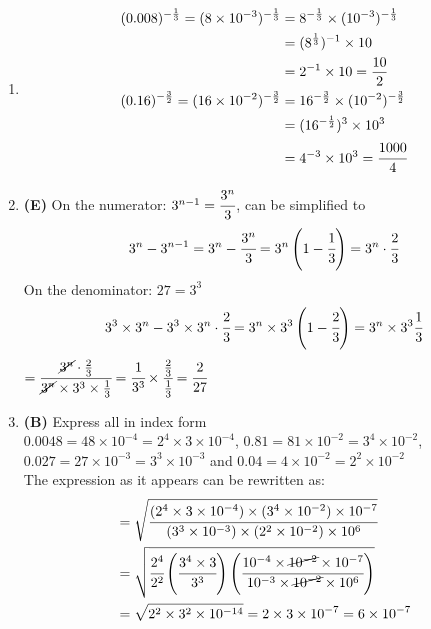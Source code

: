 \begin{multicols}{2}
\begin{enumerate}[label={\arabic*.}]
    \item 
    \begin{align*} 
        (0.008)^{-\frac{1}{3}} = (8 \times 10^{-3})^{-\frac{1}{3}} &= 8^{-\frac{1}{3}} \times (10^{-3})^{-\frac{1}{3}} \\
        & = (8^{\frac{1}{3}})^{-1} \times 10 \\
        & = 2^{-1} \times 10  = \dfrac{10}{2}\\
        (0.16)^{-\frac{3}{2}} = (16 \times 10^{-2})^{-\frac{3}{2}} &= 16^{-\frac{3}{2}} \times (10^{-2})^{-\frac{3}{2}} \\
        &= (16^{-\frac{1}{2}})^3 \times 10^3 \\
        & = 4^{-3} \times 10^3 =\cfrac{1000}{4}
    \end{align*}

    \item \textbf{(E)} On the numerator: $3^{n-1} = \cfrac{3^n}{3}$,  can be simplified to
    $$3^n - 3^{n-1}= 3^n - \cfrac{3^n}{3} = 3^n\left(1- \cfrac{1}{3}\right) = 3^n \cdot \cfrac{2}{3}$$
    On the denominator: \(27 = 3^3\)
    \[3^3 \times 3^n - 3^3 \times 3^n \cdot \cfrac{2}{3} = 3^n \times 3^3\left(1-\cfrac{2}{3}\right) = 3^n \times 3^3 \cfrac{1}{3}\] 
    \(= \cfrac{\cancel{3^n} \cdot \frac{2}{3}}{\cancel{3^n} \times 3^3 \times \frac{1}{3}}  = \cfrac{1}{3^{3}} \times \cfrac{\frac{2}{3}}{\frac{1}{3}} = \cfrac{2}{27}\)

    \item \textbf{(B)} Express all in index form \\
    $0.0048 = 48 \times 10^{-4} = 2^4 \times 3 \times 10^{-4}$, $0.81 = 81 \times 10^{-2} = 3^4 \times 10^{-2}$, $0.027 = 27 \times 10^{-3} = 3^3 \times 10^{-3}$ and $0.04 = 4 \times 10^{-2} = 2^2 \times 10^{-2}$ \\
    The expression as it appears can be rewritten as: 
    \begin{align*}
        &= \sqrt{\cfrac{(2^4 \times 3 \times 10^{-4}) \times (3^4 \times 10^{-2}) \times 10^{-7}}{(3^3 \times 10^{-3}) \times (2^2 \times 10^{-2}) \times 10^6 }} \\
        & = \sqrt{\cfrac{2^4 }{2^2}\left( \cfrac{3^4 \times 3}{3^3} \right) \left(\cfrac{10^{-4} \times \cancel{10^{-2}} \times 10^{-7}}{10^{-3} \times \cancel{10^{-2}} \times 10^6}\right) } \\
        & = \sqrt{2^2 \times 3^2 \times 10^{-14} } = 2 \times 3 \times 10^{-7} = 6 \times 10^{-7}
    \end{align*}


\end{enumerate}
\end{multicols}
